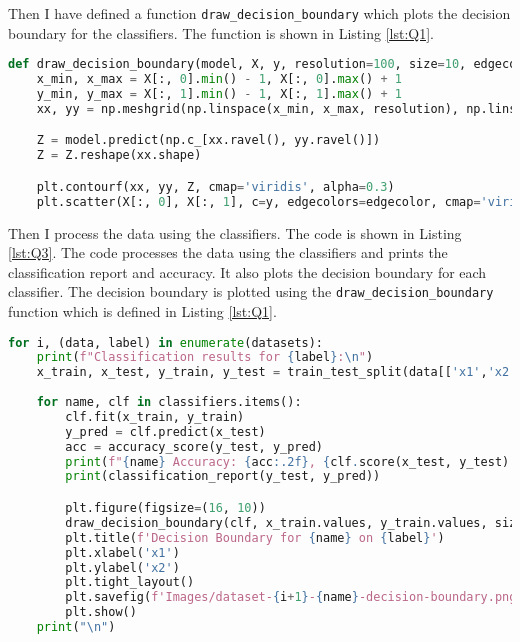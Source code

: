 Then I have defined a function \texttt{draw\_decision\_boundary} which plots the decision boundary for the classifiers. The function is shown in Listing \ref{lst:Q1}.

\begin{lstlisting}[language=Python, caption=Function to Draw Decision Boundary, label={lst:Q1}]
def draw_decision_boundary(model, X, y, resolution=100, size=10, edgecolor='k'):
    x_min, x_max = X[:, 0].min() - 1, X[:, 0].max() + 1
    y_min, y_max = X[:, 1].min() - 1, X[:, 1].max() + 1
    xx, yy = np.meshgrid(np.linspace(x_min, x_max, resolution), np.linspace(y_min, y_max, resolution))

    Z = model.predict(np.c_[xx.ravel(), yy.ravel()])
    Z = Z.reshape(xx.shape)

    plt.contourf(xx, yy, Z, cmap='viridis', alpha=0.3)
    plt.scatter(X[:, 0], X[:, 1], c=y, edgecolors=edgecolor, cmap='viridis', s=size) 
\end{lstlisting}

Then I process the data using the classifiers. The code is shown in Listing \ref{lst:Q3}. The code processes the data using the classifiers and prints the classification report and accuracy. It also plots the decision boundary for each classifier. The decision boundary is plotted using the \texttt{draw\_decision\_boundary} function which is defined in Listing \ref{lst:Q1}.

\begin{lstlisting}[language=Python, caption=Processing Data using Classifiers, label={lst:Q3}]
for i, (data, label) in enumerate(datasets):
    print(f"Classification results for {label}:\n")
    x_train, x_test, y_train, y_test = train_test_split(data[['x1','x2']], data['y'], test_size=0.2, random_state=42)
    
    for name, clf in classifiers.items():
        clf.fit(x_train, y_train)
        y_pred = clf.predict(x_test)
        acc = accuracy_score(y_test, y_pred)
        print(f"{name} Accuracy: {acc:.2f}, {clf.score(x_test, y_test):.2f}")
        print(classification_report(y_test, y_pred))

        plt.figure(figsize=(16, 10))
        draw_decision_boundary(clf, x_train.values, y_train.values, size=10)
        plt.title(f'Decision Boundary for {name} on {label}')
        plt.xlabel('x1')
        plt.ylabel('x2')
        plt.tight_layout()
        plt.savefig(f'Images/dataset-{i+1}-{name}-decision-boundary.png', dpi=400)
        plt.show()
    print("\n")
\end{lstlisting}











